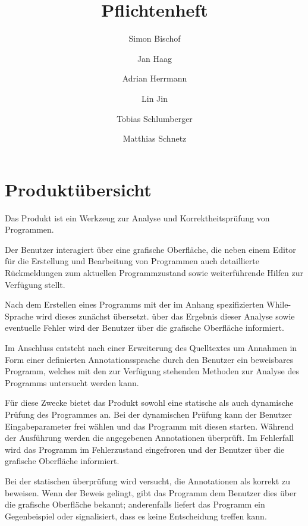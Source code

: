 \documentclass[a4paper,10pt]{article}
\title{Pflichtenheft}
\author{Simon Bischof \and Jan Haag \and Adrian Herrmann \and Lin Jin \and Tobias Schlumberger \and Matthias Schnetz}
\begin{document}
\maketitle
\newpage
\tableofcontents
\newpage

\section{Produkt\"{u}bersicht}

Das Produkt ist ein Werkzeug zur Analyse und Korrektheitspr\"{u}fung von Programmen.

Der Benutzer interagiert \"{u}ber eine grafische Oberfläche, die neben einem Editor f\"{u}r die Erstellung und Bearbeitung von Programmen auch detaillierte R\"{u}ckmeldungen zum aktuellen Programmzustand sowie weiterf\"{u}hrende Hilfen zur Verf\"{u}gung stellt.

Nach dem Erstellen eines Programms mit der im Anhang spezifizierten While-Sprache wird dieses zunächst \"{u}bersetzt. \"{u}ber das Ergebnis dieser Analyse sowie eventuelle Fehler wird der Benutzer \"{u}ber die grafische Oberfläche informiert.

Im Anschluss entsteht nach einer Erweiterung des Quelltextes um Annahmen in Form einer definierten Annotationssprache durch den Benutzer ein beweisbares Programm, welches mit den zur Verf\"{u}gung stehenden Methoden zur Analyse des Programms untersucht werden kann.

F\"{u}r diese Zwecke bietet das Produkt sowohl eine statische als auch dynamische Pr\"{u}fung des Programmes an. Bei der dynamischen Pr\"{u}fung kann der Benutzer Eingabeparameter frei wählen und das Programm mit diesen starten. Während der Ausf\"{u}hrung werden die angegebenen Annotationen \"{u}berpr\"{u}ft. Im Fehlerfall wird das Programm im Fehlerzustand eingefroren und der Benutzer \"{u}ber die grafische Oberfläche informiert.

Bei der statischen \"{u}berpr\"{u}fung wird versucht, die Annotationen als korrekt zu beweisen. Wenn der Beweis gelingt, gibt das Programm dem Benutzer dies \"{u}ber die grafische Oberfläche bekannt; anderenfalls liefert das Programm ein Gegenbeispiel oder signalisiert, dass es keine Entscheidung treffen kann.
\end{document}
